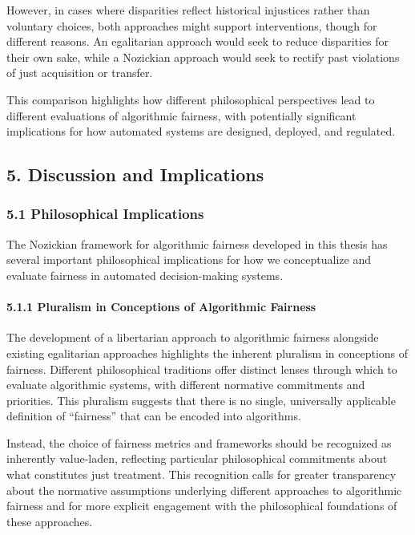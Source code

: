 However, in cases where disparities reflect historical injustices rather
than voluntary choices, both approaches might support interventions,
though for different reasons. An egalitarian approach would seek to
reduce disparities for their own sake, while a Nozickian approach would
seek to rectify past violations of just acquisition or transfer.

This comparison highlights how different philosophical perspectives lead
to different evaluations of algorithmic fairness, with potentially
significant implications for how automated systems are designed,
deployed, and regulated.

\subsection{5. Discussion and
Implications}\label{discussion-and-implications}

\subsubsection{5.1 Philosophical
Implications}\label{philosophical-implications}

The Nozickian framework for algorithmic fairness developed in this
thesis has several important philosophical implications for how we
conceptualize and evaluate fairness in automated decision-making
systems.

\paragraph{5.1.1 Pluralism in Conceptions of Algorithmic
Fairness}\label{pluralism-in-conceptions-of-algorithmic-fairness}

The development of a libertarian approach to algorithmic fairness
alongside existing egalitarian approaches highlights the inherent
pluralism in conceptions of fairness. Different philosophical traditions
offer distinct lenses through which to evaluate algorithmic systems,
with different normative commitments and priorities. This pluralism
suggests that there is no single, universally applicable definition of
``fairness'' that can be encoded into algorithms.

Instead, the choice of fairness metrics and frameworks should be
recognized as inherently value-laden, reflecting particular
philosophical commitments about what constitutes just treatment. This
recognition calls for greater transparency about the normative
assumptions underlying different approaches to algorithmic fairness and
for more explicit engagement with the philosophical foundations of these
approaches.


